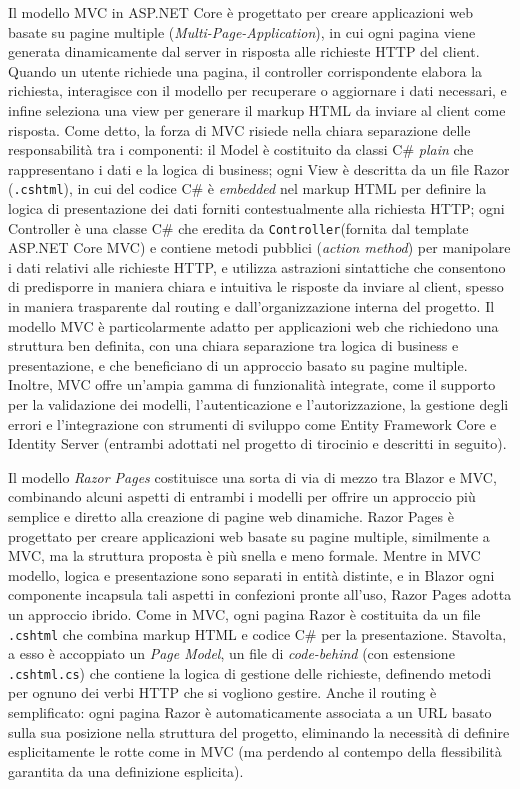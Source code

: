 Il modello MVC in ASP.NET Core è progettato per creare applicazioni web basate su pagine multiple (\emph{Multi-Page-Application}), in cui ogni pagina viene generata dinamicamente dal server in risposta alle richieste HTTP del client. Quando un utente richiede una pagina, il controller corrispondente elabora la richiesta, interagisce con il modello per recuperare o aggiornare i dati necessari, e infine seleziona una view per generare il markup HTML da inviare al client come risposta.
Come detto, la forza di MVC risiede nella chiara separazione delle responsabilità tra i componenti: il Model è costituito da classi C\# \emph{plain} che rappresentano i dati e la logica di business; ogni View è descritta da un file Razor (\texttt{.cshtml}), in cui del codice C\# è \emph{embedded} nel markup HTML per definire la logica di presentazione dei dati forniti contestualmente alla richiesta HTTP; ogni Controller è una classe C\# che eredita da \texttt{Controller}(fornita dal template ASP.NET Core MVC) e contiene metodi pubblici (\emph{action method}) per manipolare i dati relativi alle richieste HTTP, e utilizza astrazioni sintattiche che consentono di predisporre in maniera chiara e intuitiva le risposte da inviare al client, spesso in maniera trasparente dal routing e dall'organizzazione interna del progetto.
Il modello MVC è particolarmente adatto per applicazioni web che richiedono una struttura ben definita, con una chiara separazione tra logica di business e presentazione, e che beneficiano di un approccio basato su pagine multiple. Inoltre, MVC offre un'ampia gamma di funzionalità integrate, come il supporto per la validazione dei modelli, l'autenticazione e l'autorizzazione, la gestione degli errori e l'integrazione con strumenti di sviluppo come Entity Framework Core e Identity Server (entrambi adottati nel progetto di tirocinio e descritti in seguito).

Il modello \emph{Razor Pages} costituisce una sorta di via di mezzo tra Blazor e MVC, combinando alcuni aspetti di entrambi i modelli per offrire un approccio più semplice e diretto alla creazione di pagine web dinamiche.
Razor Pages è progettato per creare applicazioni web basate su pagine multiple, similmente a MVC, ma la struttura proposta è più snella e meno formale.
Mentre in MVC modello, logica e presentazione sono separati in entità distinte, e in Blazor ogni componente incapsula tali aspetti in confezioni pronte all'uso, Razor Pages adotta un approccio ibrido.
Come in MVC, ogni pagina Razor è costituita da un file \texttt{.cshtml} che combina markup HTML e codice C\# per la presentazione. Stavolta, a esso è accoppiato un \emph{Page Model}, un file di \emph{code-behind} (con estensione \texttt{.cshtml.cs}) che contiene la logica di gestione delle richieste, definendo metodi per ognuno dei verbi HTTP che si vogliono gestire.
Anche il routing è semplificato: ogni pagina Razor è automaticamente associata a un URL basato sulla sua posizione nella struttura del progetto, eliminando la necessità di definire esplicitamente le rotte come in MVC (ma perdendo al contempo della flessibilità garantita da una definizione esplicita).

